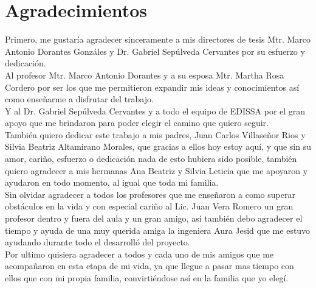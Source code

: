 \chapter*{Agradecimientos}
 Primero, me gustaría agradecer sinceramente a mis directores de tesis Mtr. Marco Antonio Dorantes Gonzáles y Dr. Gabriel Sepúlveda Cervantes por su esfuerzo y dedicación.
\\
 Al profesor Mtr. Marco Antonio Dorantes y a su esposa Mtr. Martha Rosa  Cordero por ser los que me permitieron expandir mis ideas y conocimientos así como enseñarme a disfrutar del trabajo. 
 \\
 Y al  Dr. Gabriel Sepúlveda Cervantes y a todo el equipo de EDISSA por el gran apoyo que me brindaron para poder elegir el camino que quiero seguir.
 \\
También quiero dedicar este trabajo a mis padres, Juan Carlos Villaseñor Rios y Silvia Beatriz Altamirano Morales, que gracias a ellos hoy estoy aquí, y que sin su amor, cariño, esfuerzo o dedicación nada de esto hubiera sido posible, también quiero agradecer a mis hermanas Ana Beatriz y Silvia Leticia que me apoyaron y ayudaron en todo momento, al igual que toda mi familia. 
\\
Sin olvidar agradecer a todos los profesores que me enseñaron a como superar obstáculos en la vida y con especial cariño al Lic. Juan Vera Romero un gran profesor dentro y fuera del aula y un gran amigo, así también debo agradecer el tiempo y ayuda de una muy querida amiga la ingeniera Aura Jesid que me estuvo ayudando durante todo el desarrolló del proyecto.
\\
Por ultimo quisiera agradecer a todos y cada uno de mis amigos que me acompañaron en esta etapa de mi vida, ya que llegue a pasar mas tiempo con ellos que con mi propia familia, convirtiéndose así en la familia que yo elegí.